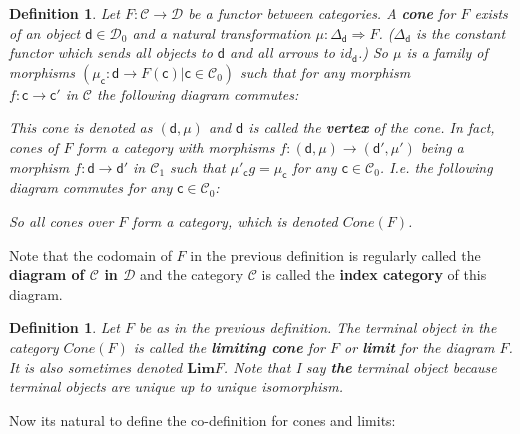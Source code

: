 \documentclass{article}
\newcommand{\cat}[1]{\mathcal{#1}} %
\newcommand{\cato}[1]{\cat{#1}_0} %
\newcommand{\catm}[1]{\cat{#1}_1} %
\newcommand{\ob}[1]{\mathsf{#1}} %
\newcommand{\limc}[1]{\bm{Lim}#1}
\newtheorem{definition}[theorem]{Definition}
\begin{document}
\begin{definition}
	Let $F: \cat{C} \rightarrow \cat{D}$ be a functor between categories. A \textbf{cone} for $F$ exists of an object $\ob{d} \in \cato{D}$ and a natural transformation $\mu: \Delta_\ob{d} \Rightarrow F$.
	($\Delta_\ob{d}$ is the constant functor which sends all objects to $\ob{d}$ and all arrows to $id_{\ob{d}}$.)
	So $\mu$ is a family of morphisms $(\mu_\ob{c}: \ob{d} \rightarrow F(\ob{c})| \ob{c} \in \cato{C})$ such that for any morphism \\
	$f: \ob{c} \rightarrow \ob{c}'$ in $\cat{C}$ the following diagram commutes:
	This cone is denoted as $(\ob{d}, \mu)$ and $\ob{d}$ is called the \textbf{vertex} of the cone.
	In fact, cones of $F$ form a category with morphisms $f: (\ob{d}, \mu) \rightarrow (\ob{d}', \mu')$ being a morphism $f: \ob{d} \rightarrow \ob{d}'$ in $\catm{C}$ such that $\mu'_\ob{c}g = \mu_\ob{c}$
	for any $\ob{c} \in \cato{C}$. I.e. the following diagram commutes for any $\ob{c} \in \cato{C}$:
	So all cones over $F$ form a category, which is denoted $Cone(F)$.
\end{definition}

Note that the codomain of $F$ in the previous definition is regularly called the \textbf{diagram of $\cat{C}$ in $\cat{D}$} and the category $\cat{C}$ is called the \textbf{index category} of this diagram.

\begin{definition}
	Let $F$ be as in the previous definition. The terminal object in the category $Cone(F)$ is called the \textbf{limiting cone} for $F$ or \textbf{limit} for the diagram $F$. It is also sometimes denoted $\limc{F}$.
	Note that I say \textbf{the} terminal object because terminal objects are unique up to unique isomorphism.

\end{definition}

Now its natural to define the co-definition for cones and limits:
\end{document}
